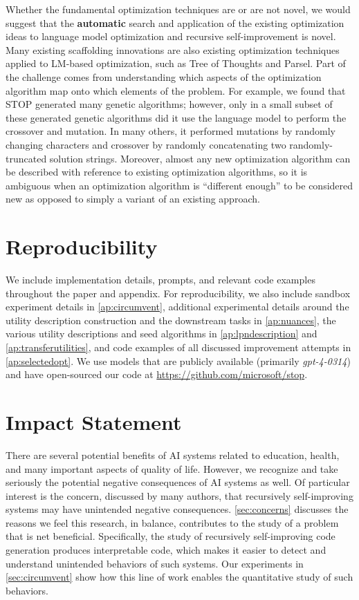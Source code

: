 \documentclass{article} %
\begin{document}
Whether the fundamental optimization techniques are or are not novel, we would suggest that the \textbf{automatic} search and application of the existing optimization ideas to language model optimization and recursive self-improvement is novel. Many existing scaffolding innovations are also existing optimization techniques applied to LM-based optimization, such as Tree of Thoughts and Parsel. Part of the challenge comes from understanding which aspects of the optimization algorithm map onto which elements of the problem. For example, we found that STOP generated many genetic algorithms; however, only in a small subset of these generated genetic algorithms did it use the language model to perform the crossover and mutation. In many others, it performed mutations by randomly changing characters and crossover by randomly concatenating two randomly-truncated solution strings. Moreover, almost any new optimization algorithm can be described with reference to existing optimization algorithms, so it is ambiguous when an optimization algorithm is “different enough” to be considered new as opposed to simply a variant of an existing approach.

%
%

\section{Reproducibility}
We include implementation details, prompts, and relevant code examples throughout the paper and appendix. For reproducibility, we also include sandbox experiment details in
\cref{ap:circumvent}, additional experimental details around the utility description construction and the downstream tasks in 
\cref{ap:nuances}, the various utility descriptions and seed algorithms in 
\cref{ap:lpndescription} and \cref{ap:transferutilities},
and code examples of all discussed improvement attempts in 
\cref{ap:selectedopt}.
We use models that are publicly available (primarily \textit{gpt-4-0314}) and have open-sourced our code at \url{https://github.com/microsoft/stop}.

\section{Impact Statement}
There are several potential benefits of AI systems related to education, health, and many important aspects of quality of life. However, we recognize and take seriously the potential negative consequences of AI systems as well. Of particular interest is the concern, discussed by many authors,   that recursively self-improving systems may have unintended negative consequences. \cref{sec:concerns} discusses the reasons we feel this research, in balance, contributes to the study of a problem that is net beneficial. Specifically, the study of recursively self-improving code generation produces interpretable code, which makes it easier to detect and understand unintended behaviors of such systems. Our experiments in \cref{sec:circumvent} show how this line of work enables the quantitative study of such behaviors.
\end{document}
